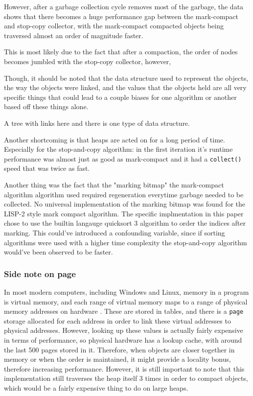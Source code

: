 \documentclass[index]{subfiles}
\begin{document}
However, after a garbage collection cycle removes most of the garbage, the data shows that there becomes a huge performance gap between the mark-compact and stop-copy collector, with the mark-compact compacted objects being traversed almost an order of magnitude faster. 

This is most likely due to the fact that after a compaction, the order of nodes becomes jumbled with the stop-copy collector, however, 


Though, it should be noted that the data structure used to represent the objects, the way the objects were linked, and the values that the objects held are all very specific things that could lead to a couple biases for one algorithm or another based off these things alone.

A tree with links here and there is one type of data structure.

Another shortcoming is that heaps are acted on for a long period of time. Especially for the stop-and-copy algorithm: in the first iteration it's runtime performance was almost just as good as mark-compact and it had a \verb+collect()+ speed that was twice as fast.

Another thing was the fact that the "marking bitmap" the mark-compact algorithm algorithm used required regeneration everytime garbage needed to be collected. No universal implementation of the marking bitmap was found for the LISP-2 style mark compact algorithm. The specific implmentation in this paper chose to use the builtin langauge quicksort 3 algorithm to order the indices after marking. This could've introduced a confounding variable, since if sorting algorithms were used with a higher time complexity the stop-and-copy algorithm would've been observed to be faster.

\subsubsection{Side note on page}

In most modern computers, including Windows and Linux, memory in a program is virtual memory, and each range of virtual memory maps to a range of physical memory addresses on hardware \cite{code_project}. These are stored in tables, and there is a \verb+page+ storage allocated for each address in order to link these virtual addresses to physical addresses. However, looking up these values is actually fairly expensive in terms of performance, so physical hardware has a lookup cache, with around the last 500 pages stored in it. Therefore, when objects are closer together in memory or when the order is maintained, it might provide a locality bonus, therefore increasing performance. However, it is still important to note that this implementation still traverses the heap itself 3 times in order to compact objects, which would be a fairly expensive thing to do on large heaps.
\end{document}
